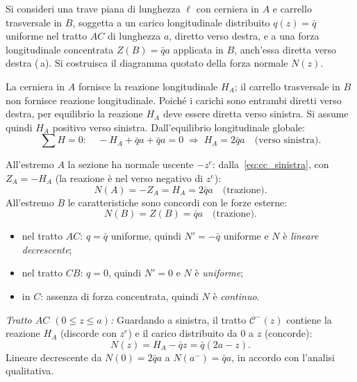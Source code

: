 \begin{esempio}
	Si consideri una trave piana di lunghezza $\ell$
	con cerniera in $A$ e carrello trasversale in $B$,
	soggetta a un carico longitudinale distribuito
	$q(z) = \bar{q}$ uniforme nel tratto $AC$ di
	lunghezza $a$, diretto verso destra, e a una
	forza longitudinale concentrata $Z(B) = \bar{q}a$
	applicata in $B$, anch'essa diretta verso destra (\,a).
	Si costruisca il diagramma quotato della forza normale
	$N(z)$.
	
	\begin{svolgimento}
		



		
		
		La cerniera in $A$ fornisce la reazione
		longitudinale $H_A$; il carrello trasversale
		in $B$ non fornisce reazione longitudinale.
		Poiché i carichi sono entrambi diretti verso
		destra, per equilibrio la reazione $H_A$ deve
		essere diretta verso sinistra.
		Si assume quindi $H_A$ positivo verso sinistra.
		Dall'equilibrio longitudinale globale:
		\[
		\sum H = 0:\quad
		-H_A + \bar{q}a + \bar{q}a = 0
		\;\Rightarrow\;
		H_A = 2\bar{q}a \quad\text{(verso sinistra)}.
		\]
		
		All'estremo $A$ la sezione ha normale uscente
		$-z^e$: dalla~\eqref{eq:cc_sinistra}, con
		$Z_A = -H_A$ (la reazione è nel verso negativo
		di $z^e$):
		\[
		N(A) = -Z_A = H_A = 2\bar{q}a
		\quad\text{(trazione)}.
		\]
		All'estremo $B$ le caratteristiche sono concordi
		con le forze esterne:
		\[
		N(B) = Z(B) = \bar{q}a \quad\text{(trazione)}.
		\]
		
		\begin{itemize}[nosep]
			\item nel tratto $AC$: $q = \bar{q}$ uniforme,
			quindi $N' = -\bar{q}$ uniforme e $N$ è
			\emph{lineare decrescente};
			\item nel tratto $CB$: $q = 0$, quindi $N' = 0$
			e $N$ è \emph{uniforme};
			\item in $C$: assenza di forza concentrata,
			quindi $N$ è \emph{continuo}.
		\end{itemize}
		
		
		\textit{Tratto $AC$ $(0 \leq z \leq a)$:}
		Guardando a sinistra, il tratto
		$\mathcal{C}^-(z)$ contiene la reazione
		$H_A$ (discorde con $z^e$) e il carico
		distribuito da $0$ a $z$ (concorde):
		\[
		N(z) = H_A - \bar{q}z = \bar{q}(2a - z).
		\]
		Lineare decrescente da $N(0) = 2\bar{q}a$
		a $N(a^-) = \bar{q}a$, in accordo con
		l'analisi qualitativa.
		

\end{svolgimento}
\end{esempio}
